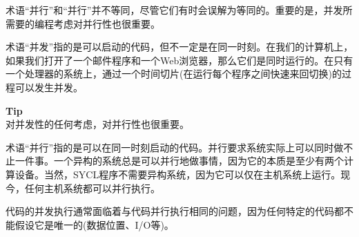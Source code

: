 术语“并行”和“并行”并不等同，尽管它们有时会误解为等同的。重要的是，并发所需要的编程考虑对并行性也很重要。\par

术语“并发”指的是可以启动的代码，但不一定是在同一时刻。在我们的计算机上，如果我们打开了一个邮件程序和一个Web浏览器，那么它们是同时运行的。在只有一个处理器的系统上，通过一个时间切片(在运行每个程序之间快速来回切换)的过程可以发生并发。\par

\begin{tcolorbox}[colback=blue!5!white,colframe=blue!75!black]
\textbf{Tip} \\
对并发性的任何考虑，对并行性也很重要。
\end{tcolorbox}

术语“并行”指的是可以在同一时刻启动的代码。并行要求系统实际上可以同时做不止一件事。一个异构的系统总是可以并行地做事情，因为它的本质是至少有两个计算设备。当然，SYCL程序不需要异构系统，因为它可以仅在主机系统上运行。现今，任何主机系统都可以并行执行。\par

代码的并发执行通常面临着与代码并行执行相同的问题，因为任何特定的代码都不能假设它是唯一的(数据位置、I/O等)。\par








